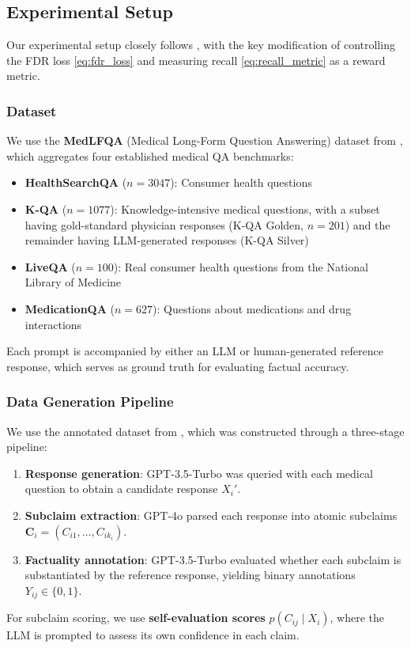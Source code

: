 \subsection{Experimental Setup}
\label{subsec:medqa_experimental_setup}

Our experimental setup closely follows \citet{cherian2024large}, with the key modification of controlling the FDR loss \eqref{eq:fdr_loss} and measuring recall \eqref{eq:recall_metric} as a reward metric.

\subsubsection{Dataset}

We use the \textbf{MedLFQA} (Medical Long-Form Question Answering) dataset from \citet{jeong2024olaph}, which aggregates four established medical QA benchmarks:
\begin{itemize}
    \item \textbf{HealthSearchQA} ($n = 3047$): Consumer health questions
    \item \textbf{K-QA} ($n = 1077$): Knowledge-intensive medical questions, with a subset having gold-standard physician responses (K-QA Golden, $n = 201$) and the remainder having LLM-generated responses (K-QA Silver)
    \item \textbf{LiveQA} ($n = 100$): Real consumer health questions from the National Library of Medicine
    \item \textbf{MedicationQA} ($n = 627$): Questions about medications and drug interactions
\end{itemize}
Each prompt is accompanied by either an LLM or human-generated reference response, which serves as ground truth for evaluating factual accuracy.

\subsubsection{Data Generation Pipeline}

We use the annotated dataset from \citet{cherian2024large}, which was constructed through a three-stage pipeline:
\begin{enumerate}
    \item \textbf{Response generation}: GPT-3.5-Turbo was queried with each medical question to obtain a candidate response $X_i'$.
    \item \textbf{Subclaim extraction}: GPT-4o parsed each response into atomic subclaims $\boldsymbol{C}_i = (C_{i1}, \ldots, C_{ik_i})$.
    \item \textbf{Factuality annotation}: GPT-3.5-Turbo evaluated whether each subclaim is substantiated by the reference response, yielding binary annotations $Y_{ij} \in \{0, 1\}$.
\end{enumerate}
For subclaim scoring, we use \textbf{self-evaluation scores} $p(C_{ij} \mid X_i)$, where the LLM is prompted to assess its own confidence in each claim.

